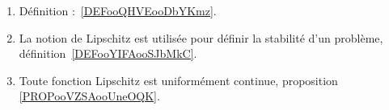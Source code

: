 
\begin{enumerate}
	\item
	      Définition :~\ref{DEFooQHVEooDbYKmz}.
	\item
	      La notion de Lipschitz est utilisée pour définir la stabilité d'un problème, définition~\ref{DEFooYIFAooSJbMkC}.
      \item 
          Toute fonction Lipschitz est uniformément continue, proposition \ref{PROPooVZSAooUneOQK}.
\end{enumerate}

